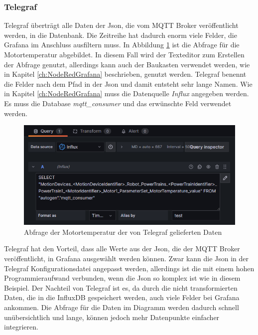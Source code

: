 \documentclass[a4paper, 12pt, oneside, toc=listofnumbered, bibliography=totoc]{scrbook}
\begin{document}
		\subsubsection{Telegraf}
		
		Telegraf überträgt alle Daten der Json, die vom MQTT Broker veröffentlicht werden, in die Datenbank. Die Zeitreihe hat dadurch enorm viele Felder, die Grafana im Anschluss ausfiltern muss. In Abbildung \ref{fig:telegrafabfrage} ist die Abfrage für die Motortemperatur abgebildet. In diesem Fall wird der Texteditor zum Erstellen der Abfrage genutzt, allerdings kann auch der Baukasten verwendet werden, wie in Kapitel \ref{ch:NodeRedGrafana} beschrieben, genutzt werden. Telegraf benennt die Felder nach dem Pfad in der Json und damit entsteht sehr lange Namen. Wie in Kapitel \ref{ch:NodeRedGrafana} muss die Datenquelle \textit{Influx} angegeben werden. Es muss die Database \textit{mqtt\_consumer} und das erwünschte Feld verwendet werden.
		
		\begin{figure}[H]
			\centering
			\includegraphics[width=0.9\linewidth]{res/TelegrafAbfrage.png}
			\caption{Abfrage der Motortemperatur der von Telegraf gelieferten Daten}
			\label{fig:telegrafabfrage}
		\end{figure}
		
		Telegraf hat den Vorteil, dass alle Werte aus der Json, die der MQTT Broker veröffentlicht, in Grafana ausgewählt werden können. Zwar kann die Json in der Telegraf Konfigurationsdatei angepasst werden, allerdings ist die mit einem hohen Programmieraufwand verbunden, wenn die Json so komplex ist wie in diesem Beispiel. Der Nachteil von Telegraf ist es, da durch die nicht transformierten Daten, die in die InfluxDB gespeichert werden, auch viele Felder bei Grafana ankommen. Die Abfrage für die Daten im Diagramm werden dadurch schnell unübersichtlich und lange, können jedoch mehr Datenpunkte einfacher integrieren.
		
\end{document}
